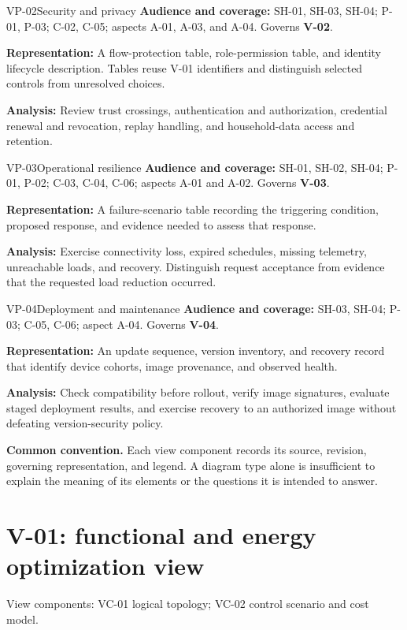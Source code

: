 \documentclass[11pt,letterpaper]{article}
\newcommand{\id}[1]{\textsf{\textbf{#1}}}
\newcommand{\pageintro}[1]{{\color{Muted}#1}\par\vspace{3pt}}
\begin{document}
\begin{specbox}{VP-02\enspace Security and privacy}
\small
\textbf{Audience and coverage:} SH-01, SH-03, SH-04; P-01, P-03; C-02, C-05;
aspects A-01, A-03, and A-04. Governs \id{V-02}.

\textbf{Representation:} A flow-protection table, role-permission table, and
identity lifecycle description. Tables reuse V-01 identifiers and distinguish
selected controls from unresolved choices.

\textbf{Analysis:} Review trust crossings, authentication and authorization,
credential renewal and revocation, replay handling, and household-data access
and retention.
\end{specbox}

\begin{specbox}{VP-03\enspace Operational resilience}
\small
\textbf{Audience and coverage:} SH-01, SH-02, SH-04; P-01, P-02;
C-03, C-04, C-06; aspects A-01 and A-02. Governs \id{V-03}.

\textbf{Representation:} A failure-scenario table recording the triggering
condition, proposed response, and evidence needed to assess that response.

\textbf{Analysis:} Exercise connectivity loss, expired schedules, missing
telemetry, unreachable loads, and recovery. Distinguish request acceptance
from evidence that the requested load reduction occurred.
\end{specbox}

\begin{specbox}{VP-04\enspace Deployment and maintenance}
\small
\textbf{Audience and coverage:} SH-03, SH-04; P-03; C-05, C-06;
aspect A-04. Governs \id{V-04}.

\textbf{Representation:} An update sequence, version inventory, and recovery
record that identify device cohorts, image provenance, and observed health.

\textbf{Analysis:} Check compatibility before rollout, verify image signatures,
evaluate staged deployment results, and exercise recovery to an authorized
image without defeating version-security policy.
\end{specbox}

\textbf{Common convention.} Each view component records its source, revision,
governing representation, and legend. A diagram type alone is insufficient to
explain the meaning of its elements or the questions it is intended to answer.

\newpage
\section{V-01: functional and energy optimization view}
\pageintro{View components: VC-01 logical topology; VC-02 control scenario and cost model.}
\end{document}
